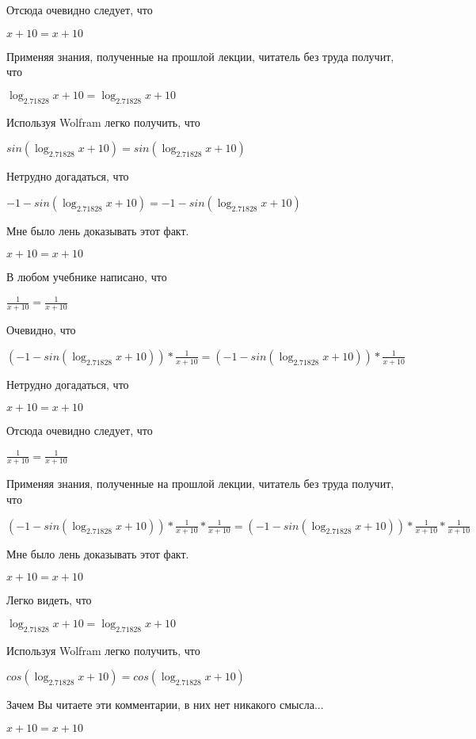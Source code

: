 \documentclass[12pt,a4paper,fleqn]{article}
\theoremstyle{definition}
\begin{document}
Отсюда очевидно следует, что 

$ x  +  10  =  x  +  10 $

Применяя знания, полученные на прошлой лекции, читатель без труда получит, что 

$\log_{ 2.71828 }{ x  +  10 } = \log_{ 2.71828 }{ x  +  10 }$

Используя Wolfram легко получить, что 

$sin(\log_{ 2.71828 }{ x  +  10 }) = sin(\log_{ 2.71828 }{ x  +  10 })$

Нетрудно догадаться, что 

$ -1  - sin(\log_{ 2.71828 }{ x  +  10 }) =  -1  - sin(\log_{ 2.71828 }{ x  +  10 })$

Мне было лень доказывать этот факт.

$ x  +  10  =  x  +  10 $

В любом учебнике написано, что 

$\frac{ 1 }{ x  +  10 }
 = \frac{ 1 }{ x  +  10 }
$

Очевидно, что 

$( -1  - sin(\log_{ 2.71828 }{ x  +  10 })) * \frac{ 1 }{ x  +  10 }
 = ( -1  - sin(\log_{ 2.71828 }{ x  +  10 })) * \frac{ 1 }{ x  +  10 }
$

Нетрудно догадаться, что 

$ x  +  10  =  x  +  10 $

Отсюда очевидно следует, что 

$\frac{ 1 }{ x  +  10 }
 = \frac{ 1 }{ x  +  10 }
$

Применяя знания, полученные на прошлой лекции, читатель без труда получит, что 

$( -1  - sin(\log_{ 2.71828 }{ x  +  10 })) * \frac{ 1 }{ x  +  10 }
 * \frac{ 1 }{ x  +  10 }
 = ( -1  - sin(\log_{ 2.71828 }{ x  +  10 })) * \frac{ 1 }{ x  +  10 }
 * \frac{ 1 }{ x  +  10 }
$

Мне было лень доказывать этот факт.

$ x  +  10  =  x  +  10 $

Легко видеть, что 

$\log_{ 2.71828 }{ x  +  10 } = \log_{ 2.71828 }{ x  +  10 }$

Используя Wolfram легко получить, что 

$cos(\log_{ 2.71828 }{ x  +  10 }) = cos(\log_{ 2.71828 }{ x  +  10 })$

Зачем Вы читаете эти комментарии, в них нет никакого смысла... 

$ x  +  10  =  x  +  10 $
\end{document}
